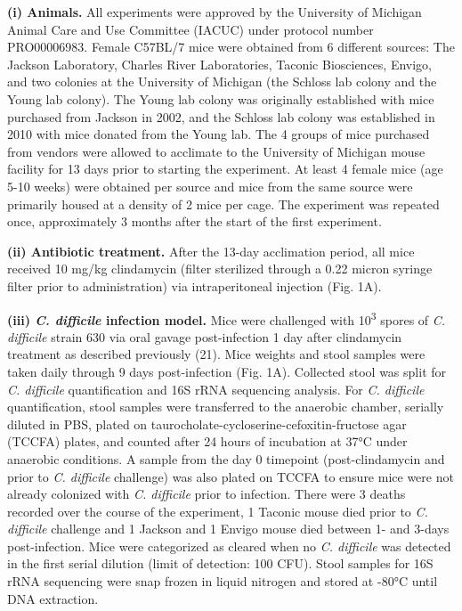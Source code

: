 \documentclass[
  11pt,
]{article}
\begin{document}
\textbf{(i) Animals.} All experiments were approved by the University of
Michigan Animal Care and Use Committee (IACUC) under protocol number
PRO00006983. Female C57BL/7 mice were obtained from 6 different sources:
The Jackson Laboratory, Charles River Laboratories, Taconic Biosciences,
Envigo, and two colonies at the University of Michigan (the Schloss lab
colony and the Young lab colony). The Young lab colony was originally
established with mice purchased from Jackson in 2002, and the Schloss
lab colony was established in 2010 with mice donated from the Young lab.
The 4 groups of mice purchased from vendors were allowed to acclimate to
the University of Michigan mouse facility for 13 days prior to starting
the experiment. At least 4 female mice (age 5-10 weeks) were obtained
per source and mice from the same source were primarily housed at a
density of 2 mice per cage. The experiment was repeated once,
approximately 3 months after the start of the first experiment.

\textbf{(ii) Antibiotic treatment.} After the 13-day acclimation period,
all mice received 10 mg/kg clindamycin (filter sterilized through a 0.22
micron syringe filter prior to administration) via intraperitoneal
injection (Fig. 1A).

\textbf{(iii) \emph{C. difficile} infection model.} Mice were challenged
with 10\textsuperscript{3} spores of \emph{C. difficile} strain 630 via
oral gavage post-infection 1 day after clindamycin treatment as
described previously (21). Mice weights and stool samples were taken
daily through 9 days post-infection (Fig. 1A). Collected stool was split
for \emph{C. difficile} quantification and 16S rRNA sequencing analysis.
For \emph{C. difficile} quantification, stool samples were transferred
to the anaerobic chamber, serially diluted in PBS, plated on
taurocholate-cycloserine-cefoxitin-fructose agar (TCCFA) plates, and
counted after 24 hours of incubation at 37°C under anaerobic conditions.
A sample from the day 0 timepoint (post-clindamycin and prior to
\emph{C. difficile} challenge) was also plated on TCCFA to ensure mice
were not already colonized with \emph{C. difficile} prior to infection.
There were 3 deaths recorded over the course of the experiment, 1
Taconic mouse died prior to \emph{C. difficile} challenge and 1 Jackson
and 1 Envigo mouse died between 1- and 3-days post-infection. Mice were
categorized as cleared when no \emph{C. difficile} was detected in the
first serial dilution (limit of detection: 100 CFU). Stool samples for
16S rRNA sequencing were snap frozen in liquid nitrogen and stored at
-80°C until DNA extraction.
\end{document}

